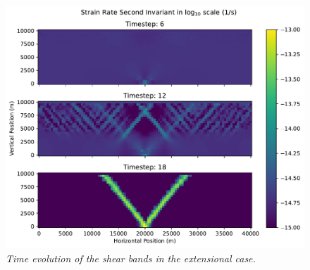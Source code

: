 \begin{figure}[h]
\centering
\includegraphics[width=12cm]{../../benchmarks/viscoelastic_plastic_shear_bands/kaus_2010/doc/kaus10_vep.pdf}
\caption{\it Time evolution of the shear bands in the extensional case.}
\label{fig:kaus_brick_result}
\end{figure}
